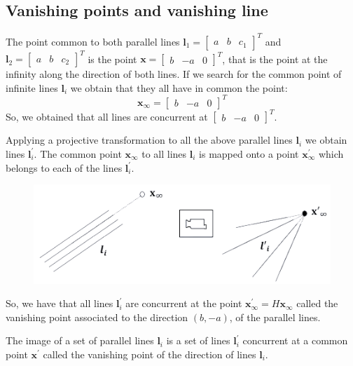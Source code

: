 \documentclass[12pt, a4paper]{report}
\begin{document}
    \subsection{Vanishing points and vanishing line}
    The point common to both parallel lines $\boldsymbol{l}_1={\begin{bmatrix} a & b & c_1 \end{bmatrix}}^{T}$ and $\boldsymbol{l}_2={\begin{bmatrix} a & b & c_2 \end{bmatrix}}^{T}$ is the 
    point $\boldsymbol{x}={\begin{bmatrix} b & -a & 0 \end{bmatrix}}^{T}$, that is the point at the infinity along the direction of both lines. If we search for the common point of 
    infinite lines $\boldsymbol{l}_i$ we obtain that they all have in common the point: 
    \[\boldsymbol{x}_{\infty}={\begin{bmatrix} b & -a & 0 \end{bmatrix}}^{T}\]
    So, we obtained that all lines are concurrent at ${\begin{bmatrix} b & -a & 0 \end{bmatrix}}^{T}$. 
    
    Applying a projective transformation to all the above parallel lines $\boldsymbol{l}_i$ we obtain lines $\boldsymbol{l}_i^{'}$. The common point $\boldsymbol{x}_{\infty}$ to all lines
    $\boldsymbol{l}_i$ is mapped onto a point $\boldsymbol{x}_{\infty}^{'}$ which belongs to each of the lines $\boldsymbol{l}_i^{'}$. 
    \begin{figure}[H]
        \centering
        \includegraphics[width=0.5\linewidth]{images/vanishing.png}
    \end{figure}
    So, we have that all lines $\boldsymbol{l}_i^{'}$ are concurrent at the point $\boldsymbol{x}_{\infty}^{'}=H\boldsymbol{x}_{\infty}$ called the vanishing point associated to the direction 
    $(b,-a)$, of the parallel lines. 
    \begin{theorem}
        The image of a set of parallel lines $\boldsymbol{l}_i$ is a set of lines $\boldsymbol{l}_i^{'}$ concurrent at a common point $\boldsymbol{x}^{'}$ called the vanishing point of the 
        direction of lines $\boldsymbol{l}_i$. 
    \end{theorem}
\end{document}
